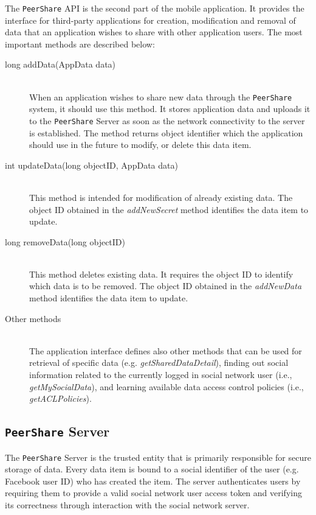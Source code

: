 \documentclass[twocolumn,a4paper,10pt]{article}
\newcommand{\peershare}{\texttt{PeerShare}\xspace}
\begin{document}
The \peershare API is the second part of the mobile application. It provides the interface for third-party applications for creation, modification and removal of data that an application wishes to share with other application users. The most important methods are described below:
\begin{description}
\item[long addData(AppData data)] \hfill \\
When an application wishes to share new data through the \peershare system, it should use this method. It stores application data and uploads it to the \peershare Server as soon as the network connectivity to the server is established. The method returns object identifier which the application should use in the future to modify, or delete this data item.
\item[int updateData(long objectID, AppData data)] \hfill \\
This method is intended for modification of already existing data. The object ID obtained in the \emph{addNewSecret} method identifies the data item to update. 
\item[long removeData(long objectID)] \hfill \\
This method deletes existing data. It requires the object ID to identify which data is to be removed. The object ID obtained in the \emph{addNewData} method identifies the data item to update. 
\item[Other methods] \hfill \\
The application interface defines also other methods that can be used for retrieval of specific data (e.g. \emph{getSharedDataDetail}), finding out social information related to the currently logged in social network user (i.e., \emph{getMySocialData}), and learning available data access control policies (i.e., \emph{getACLPolicies}).

\end{description}

\subsection{\peershare Server}


The \peershare Server is the trusted entity that is primarily responsible for secure storage of data. Every data item is bound to a social identifier of the user (e.g. Facebook user ID) who has created the item. The server authenticates users by requiring them to provide a valid social network user access token and verifying its correctness through interaction with the social network server. 
\end{document}
